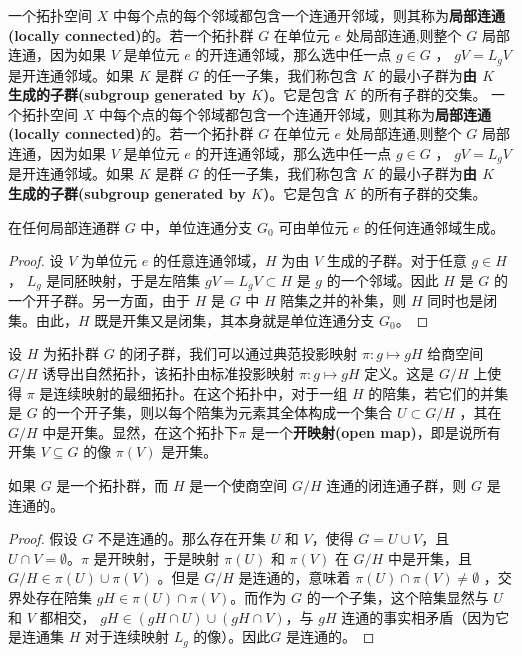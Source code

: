 \begin{theorem}
\begin{theorem}
一个拓扑空间 $X$ 中每个点的每个邻域都包含一个连通开邻域，则其称为\textbf{局部连通(locally connected)}的。若一个拓扑群 $G$ 在单位元 $e$ 处局部连通,则整个 $G$ 局部连通，因为如果 $V$ 是单位元 $e$ 的开连通邻域，那么选中任一点 $g\in G$ ， $gV =L_{g} V$ 是开连通邻域。如果 $K$ 是群 $G$ 的任一子集，我们称包含 $K$ 的最小子群为\textbf{由 $K$ 生成的子群(subgroup generated by $ K$)}。它是包含 $K$ 的所有子群的交集。
一个拓扑空间 $X$ 中每个点的每个邻域都包含一个连通开邻域，则其称为\textbf{局部连通(locally connected)}的。若一个拓扑群 $G$ 在单位元 $e$ 处局部连通,则整个 $G$ 局部连通，因为如果 $V$ 是单位元 $e$ 的开连通邻域，那么选中任一点 $g\in G$ ， $gV =L_{g} V$ 是开连通邻域。如果 $K$ 是群 $G$ 的任一子集，我们称包含 $K$ 的最小子群为\textbf{由 $K$ 生成的子群(subgroup generated by $ K$)}。它是包含 $K$ 的所有子群的交集。

\begin{theorem}\label{eg:10.21}
	在任何局部连通群 $G$ 中，单位连通分支 $G_{0}$ 可由单位元 $e$ 的任何连通邻域生成。
\end{theorem}

\begin{proof}
	设 $V$ 为单位元 $e$ 的任意连通邻域，$H$ 为由 $V$ 生成的子群。对于任意 $g\in H$， $L_{g}$ 是同胚映射，于是左陪集 $gV=L_{g} V\subset H$ 是 $g$ 的一个邻域。因此 $H$ 是 $G$ 的一个开子群。另一方面，由于 $H$ 是 $G$ 中 $H$ 陪集之并的补集，则 $H$ 同时也是闭集。由此，$H$ 既是开集又是闭集，其本身就是单位连通分支 $G_{0}$。
\end{proof}

	设 $H$ 为拓扑群 $G$ 的闭子群，我们可以通过典范投影映射 $\pi :g\mapsto gH$ 给商空间 $G/H$ 诱导出自然拓扑，该拓扑由标准投影映射 $\pi :g\mapsto gH$ 定义。这是 $G/H$ 上使得 $\pi $ 是连续映射的最细拓扑。在这个拓扑中，对于一组 $H$ 的陪集，若它们的并集是 $G$ 的一个开子集，则以每个陪集为元素其全体构成一个集合 $U\subset G/H$ ，其在 $G/H$ 中是开集。显然，在这个拓扑下$\pi $ 是一个\textbf{开映射(open map)}，即是说所有开集 $V\subseteq G$ 的像 $\pi (V)$ 是开集。

\begin{theorem}\label{eg:10.22}
	如果 $G$ 是一个拓扑群，而 $H$ 是一个使商空间 $G/H$ 连通的闭连通子群，则 $G$ 是连通的。
\end{theorem}

\begin{proof}
	假设 $G$ 不是连通的。那么存在开集 $U$ 和 $V$，使得 $G=U\cup V$，且 $U\cap V=\emptyset $。$\pi $ 是开映射，于是映射 $\pi (U)$ 和 $\pi (V)$ 在 $G/H$ 中是开集，且 $G/H\in \pi (U)\cup \pi (V)$ 。但是 $G/H$ 是连通的，意味着 $\pi (U)\cap \pi (V)\neq \emptyset $ ，交界处存在陪集 $gH\in \pi (U)\cap \pi (V)$。而作为 $G$ 的一个子集，这个陪集显然与 $ U$ 和 $ V$ 都相交， $gH\in (gH\cap U)\cup (gH\cap V)$，与 $gH$ 连通的事实相矛盾（因为它是连通集 $ H$ 对于连续映射 $L_{g}$ 的像）。因此$G$ 是连通的。
\end{proof}


\end{theorem}
\end{theorem}
